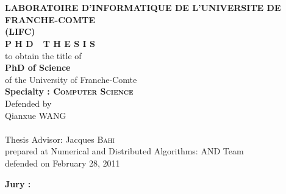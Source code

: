 \begin{titlepage}





\begin{center}

 \\
\vspace*{0.3cm}
 \\
\noindent \textbf{LABORATOIRE D'INFORMATIQUE DE L'UNIVERSITE DE FRANCHE-COMTE\\ (LIFC) } \\
\vspace*{0.5cm}
\noindent \Huge \textbf{P H D\ \ T H E S I S} \\
\vspace*{0.3cm}
\noindent \large {to obtain the title of} \\
\vspace*{0.3cm}
\noindent \LARGE \textbf{PhD of Science} \\
\vspace*{0.3cm}
\noindent \Large of the University of Franche-Comte \\
\noindent \Large \textbf{Specialty : \textsc{Computer Science}}\\
\vspace*{0.4cm}
\noindent \large {Defended by\\}
\noindent \LARGE Qianxue \textsc{WANG} \\
\vspace*{0.8cm}
 \\
\vspace*{0.8cm}
\noindent \Large Thesis Advisor:  Jacques \textsc{Bahi} \\
\vspace*{0.2cm}
\noindent \Large prepared at Numerical and Distributed Algorithms: \textsc{AND} Team\\
\vspace*{0.2cm}
\noindent \large defended on February 28, 2011 \\
\vspace*{0.5cm}
\end{center}
\noindent \large \textbf{Jury :} \\
\begin{center}

\end{center}
\end{titlepage}
